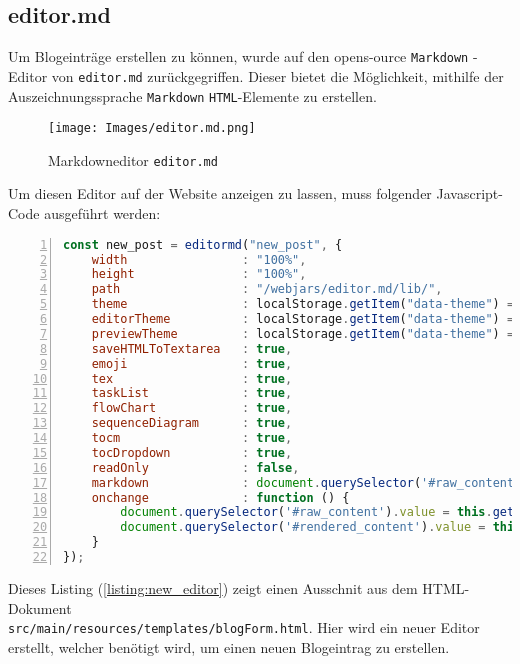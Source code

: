 \documentclass[paper=a4,12pt]{scrreprt}
\begin{document}
\subsection{editor.md}
\label{ssec:editor_md}

Um Blogeinträge erstellen zu können, wurde auf den opens-ource \texttt{Markdown} - Editor von \texttt{editor.md}\cite{editormd} zurückgegriffen. Dieser bietet die Möglichkeit, mithilfe der Auszeichnungssprache \texttt{Markdown} \texttt{HTML}-Elemente zu erstellen.\newline
\begin{figure}[!h]
  \centering
  \texttt{[image: Images/editor.md.png]}
  \caption{Markdowneditor \texttt{editor.md}}
\end{figure}

Um diesen Editor auf der Website anzeigen zu lassen, muss folgender Javascript-Code ausgeführt werden:\newline
\begin{lstlisting}[caption={editor.md - Deklaration}, captionpos=b, label={listing:new_editor}, language=javascript, numbers=left,
  stepnumber=1]
const new_post = editormd("new_post", {
    width                : "100%",
    height               : "100%",
    path                 : "/webjars/editor.md/lib/",
    theme                : localStorage.getItem("data-theme") === "dark" ? "dark" : "default",
    editorTheme          : localStorage.getItem("data-theme") === "dark" ? "monokai" : "solarized",
    previewTheme         : localStorage.getItem("data-theme") === "dark" ? "dark" : "default",
    saveHTMLToTextarea   : true,
    emoji                : true,
    tex                  : true,
    taskList             : true,
    flowChart            : true,
    sequenceDiagram      : true,
    tocm                 : true,
    tocDropdown          : true,
    readOnly             : false,
    markdown             : document.querySelector('#raw_content').value !== '' ? document.querySelector('#raw_content').value : "## Welcome to our small and geeky network! Enjoy it!",
    onchange             : function () {
        document.querySelector('#raw_content').value = this.getMarkdown();
        document.querySelector('#rendered_content').value = this.getHTML();
    }
});
\end{lstlisting}

Dieses Listing (\ref{listing:new_editor}) zeigt einen Ausschnit aus dem HTML-Dokument\\ \texttt{src/main/resources/templates/blogForm.html}. Hier wird ein neuer Editor erstellt, welcher benötigt wird, um einen neuen Blogeintrag zu erstellen.\newline
\end{document}
